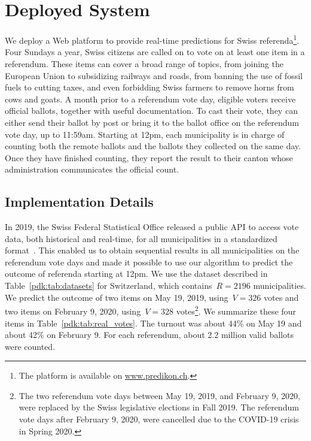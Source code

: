 \section{Deployed System}%
\label{pdk:sec:depsys}

We deploy a Web platform to provide real-time predictions for Swiss referenda\footnote{The platform is available on \href{http://www.predikon.ch}{www.predikon.ch}.}.
Four Sundays a year, Swiss citizens are called on to vote on at least one item in a referendum.
These items can cover a broad range of topics, from joining the European Union to subsidizing railways and roads, from banning the use of fossil fuels to cutting taxes, and even forbidding Swiss farmers to remove horns from cows and goats.
A month prior to a referendum vote day, eligible voters receive official ballots, together with useful documentation.
To cast their vote, they can either send their ballot by post or bring it to the ballot office on the referendum vote day, up to 11:59am.
Starting at 12pm, each municipality is in charge of counting both the remote ballots and the ballots they collected on the same day.
Once they have finished counting, they report the result to their canton whose administration communicates the official count.

\subsection{Implementation Details}

In 2019, the Swiss Federal Statistical Office released a public API to access vote data, both historical and real-time, for all municipalities in a standardized format~\cite{confederation2020open}.
This enabled us to obtain sequential results in all municipalities on the referendum vote days and made it possible to use our algorithm to predict the outcome of referenda starting at 12pm.
We use the dataset described in Table~\ref{pdk:tab:datasets} for Switzerland, which contains~$R = 2196$ municipalities.
We predict the outcome of two items on May 19, 2019, using~$V = 326$ votes and two items on February 9, 2020, using~$V = 328$ votes\footnote{The two referendum vote days between May 19, 2019, and February 9, 2020, were replaced by the Swiss legislative elections in Fall 2019. The referendum vote days after February 9, 2020, were cancelled due to the COVID-19 crisis in Spring 2020.}.
We summarize these four items in Table~\ref{pdk:tab:real_votes}.
The turnout was about 44\% on May 19 and about 42\% on February 9.
For each referendum, about 2.2 million valid ballots were counted.

